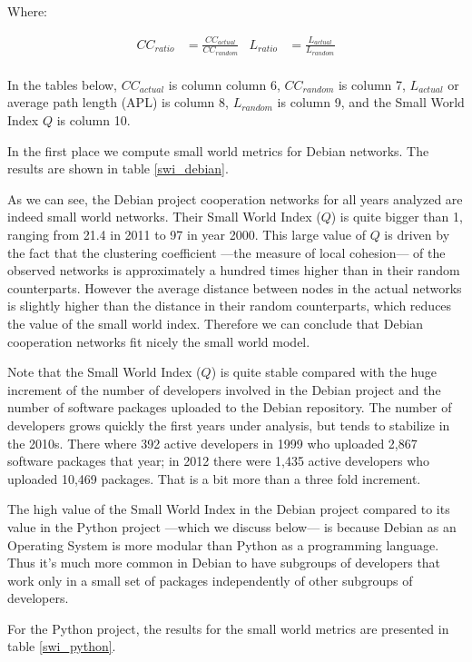 Where:

\begin{align}
CC_{ratio}& = \frac{CC_{actual}}{CC_{random}} &
L_{ratio}& = \frac{L_{actual}}{L_{random}} \nonumber \\
\end{align}

In the tables below, $CC_{actual}$ is column column 6, $CC_{random}$ is column 7, $L_{actual}$ or average path length (APL) is column 8, $L_{random}$ is column 9, and the Small World Index $Q$ is column 10.

In the first place we compute small world metrics for Debian networks. The results are shown in table \ref{swi_debian}.



As we can see, the Debian project cooperation networks for all years analyzed are indeed small world networks. Their Small World Index ($Q$) is quite bigger than 1, ranging from 21.4 in 2011 to 97 in year 2000. This large value of $Q$ is driven by the fact that the clustering coefficient ---the measure of local cohesion--- of the observed networks is approximately a hundred times higher than in their random counterparts. However the average distance between nodes in the actual networks is slightly higher than the distance in their random counterparts, which reduces the value of the small world index. Therefore we can conclude that Debian cooperation networks fit nicely the small world model. 

Note that the Small World Index ($Q$) is quite stable compared with the huge increment of the number of developers involved in the Debian project and the number of software packages uploaded to the Debian repository. The number of developers grows quickly the first years under analysis, but tends to stabilize in the 2010s. There where 392 active developers in 1999 who uploaded 2,867 software packages that year; in 2012 there were 1,435 active developers who uploaded 10,469 packages. That is a bit more than a three fold increment.

The high value of the Small World Index in the Debian project compared to its value in the Python project ---which we discuss below--- is because Debian as an Operating System is more modular than Python as a programming language. Thus it's much more common in Debian to have subgroups of developers that work only in a small set of packages independently of other subgroups of developers.

For the Python project, the results for the small world metrics are presented in table \ref{swi_python}.

